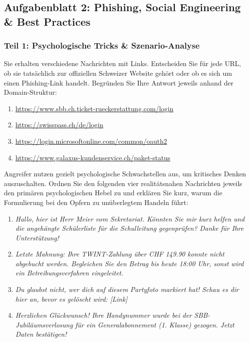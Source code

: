 \documentclass[12pt,a4paper]{article}
\begin{document}
\newpage
\subsection{Aufgabenblatt 2: Phishing, Social Engineering \& \newline Best Practices}
\label{subsec:aufgaben_phishing}

\subsubsection{Teil 1: Psychologische Tricks \& Szenario-Analyse}

\begin{taskbox}
Sie erhalten verschiedene Nachrichten mit Links. Entscheiden Sie für jede URL, ob sie tatsächlich zur offiziellen Schweizer Website gehört oder ob es sich um einen Phishing-Link handelt. Begründen Sie Ihre Antwort jeweils anhand der Domain-Struktur:
\begin{enumerate}[label=\alph*)]
    \item \url{https://www.sbb.ch.ticket-rueckerstattung.com/login}
    \item \url{https://swisspass.ch/de/login}
    \item \url{https://login.microsoftonline.com/common/oauth2}
    \item \url{https://www.galaxus-kundenservice.ch/paket-status}
\end{enumerate}
\end{taskbox}

\begin{taskbox}
Angreifer nutzen gezielt psychologische Schwachstellen aus, um kritisches Denken auszuschalten. Ordnen Sie den folgenden vier realitätsnahen Nachrichten jeweils den primären psychologischen Hebel zu und erklären Sie kurz, warum die Formulierung bei den Opfern zu unüberlegtem Handeln führt:
\begin{enumerate}[label=\alph*)]
    \item \textit{Hallo, hier ist Herr Meier vom Sekretariat. Könnten Sie mir kurz helfen und die angehängte Schülerliste für die Schulleitung gegenprüfen? Danke für Ihre Unterstützung!}
    \item \textit{Letzte Mahnung: Ihre TWINT-Zahlung über CHF 149.90 konnte nicht abgebucht werden. Begleichen Sie den Betrag bis heute 18:00 Uhr, sonst wird ein Betreibungsverfahren eingeleitet.}
    \item \textit{Du glaubst nicht, wer dich auf diesem Partyfoto markiert hat! Schau es dir hier an, bevor es gelöscht wird: [Link]}
    \item \textit{Herzlichen Glückwunsch! Ihre Handynummer wurde bei der SBB-Jubiläumsverlosung für ein Generalabonnement (1. Klasse) gezogen. Jetzt Daten bestätigen!}
\end{enumerate}
\end{taskbox}
\end{document}

